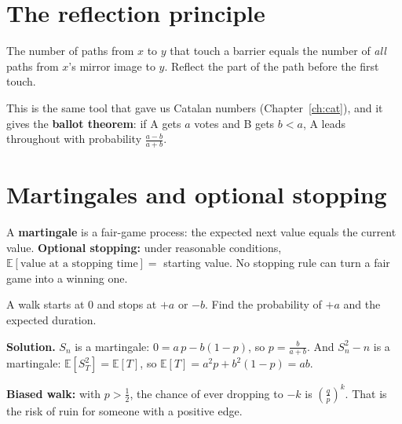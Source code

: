 \documentclass[11pt,a4paper,openany]{report}
\newcommand{\E}{\mathbb{E}}
\begin{document}
\section{The reflection principle}
\begin{idea}[Reflection]
The number of paths from $x$ to $y$ that touch a barrier equals the number of \emph{all} paths from $x$'s mirror image to $y$. Reflect the part of the path before the first touch.
\end{idea}
\begin{center}
\end{center}
This is the same tool that gave us Catalan numbers (Chapter~\ref{ch:cat}), and it gives the \textbf{ballot theorem}: if A gets $a$ votes and B gets $b<a$, A leads throughout with probability $\frac{a-b}{a+b}$.

\section{Martingales and optional stopping}
A \textbf{martingale} is a fair-game process: the expected next value equals the current value. \textbf{Optional stopping:} under reasonable conditions, $\E[\text{value at a stopping time}]=$ starting value. No stopping rule can turn a fair game into a winning one.
\begin{example}
A walk starts at 0 and stops at $+a$ or $-b$. Find the probability of $+a$ and the expected duration.

\textbf{Solution.} $S_n$ is a martingale: $0=a\,p-b(1-p)$, so $p=\frac b{a+b}$. And $S_n^2-n$ is a martingale: $\E[S_T^2]=\E[T]$, so $\E[T]=a^2p+b^2(1-p)=ab$.
\end{example}
\textbf{Biased walk:} with $p>\frac12$, the chance of ever dropping to $-k$ is $\left(\frac qp\right)^k$. That is the risk of ruin for someone with a positive edge.
\end{document}
